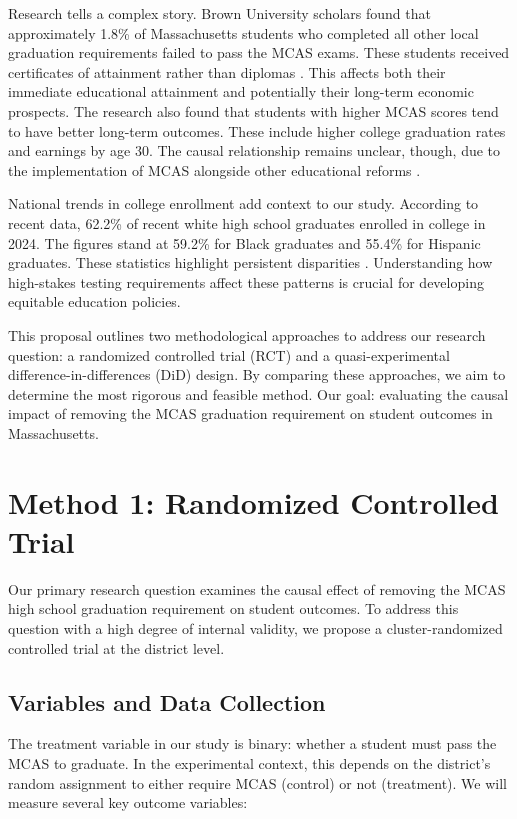 \documentclass[12pt]{article}
\begin{document}
Research tells a complex story. Brown University scholars found that approximately 1.8\% of Massachusetts students who completed all other local graduation requirements failed to pass the MCAS exams. These students received certificates of attainment rather than diplomas \citep{harvard2024}. This affects both their immediate educational attainment and potentially their long-term economic prospects. The research also found that students with higher MCAS scores tend to have better long-term outcomes. These include higher college graduation rates and earnings by age 30. The causal relationship remains unclear, though, due to the implementation of MCAS alongside other educational reforms \citep{harvard2024}.

National trends in college enrollment add context to our study. According to recent data, 62.2\% of recent white high school graduates enrolled in college in 2024. The figures stand at 59.2\% for Black graduates and 55.4\% for Hispanic graduates. These statistics highlight persistent disparities \citep{bls2024}. Understanding how high-stakes testing requirements affect these patterns is crucial for developing equitable education policies.

This proposal outlines two methodological approaches to address our research question: a randomized controlled trial (RCT) and a quasi-experimental difference-in-differences (DiD) design. By comparing these approaches, we aim to determine the most rigorous and feasible method. Our goal: evaluating the causal impact of removing the MCAS graduation requirement on student outcomes in Massachusetts.

\section{Method 1: Randomized Controlled Trial}

Our primary research question examines the causal effect of removing the MCAS high school graduation requirement on student outcomes. To address this question with a high degree of internal validity, we propose a cluster-randomized controlled trial at the district level.

\subsection{Variables and Data Collection}

The treatment variable in our study is binary: whether a student must pass the MCAS to graduate. In the experimental context, this depends on the district's random assignment to either require MCAS (control) or not (treatment). We will measure several key outcome variables:
\end{document}
